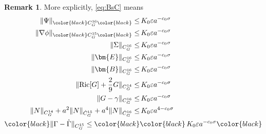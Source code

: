 \documentclass[11pt,leqno,textwidth=10cm]{amsart}
\numberwithin{equation}{section}
\theoremstyle{definition}
\newtheorem{remark}[definition]{Remark}
\theoremstyle{plain}
\newcommand{\1}{\mathbbm{1}}
\newcommand{\Ric}{\text{\normalfont{Ric}}}
\renewcommand{\epsilon}{\varepsilon}
\newcommand{\Gamhat}{\hat{\Gamma}}
\newcommand{\RE}{\bm{E}}
\newcommand{\RB}{\bm{B}}
\newcommand{\change}[1]{\color{black}#1\color{black}}
\begin{document}
\begin{remark}
More explicitly, \eqref{eq:BsC} means
\begin{subequations}
\begin{align}
\|\Psi\|_{\change{C^{16}_G}}\leq&\,K_0\epsilon a^{-c_0\sigma} \label{eq:BsPsi}\\
\|\nabla\phi\|_{\change{C^{15}_G}}\leq&\,K_0\epsilon a^{-c_0\sigma} \label{eq:Bsnablaphi}\\
\|\Sigma\|_{C^{16}_G}\leq&\,K_0\epsilon a^{-c_0\sigma} \label{eq:BsSigma}\\
\|\RE\|_{C^{16}_G}\leq&\,K_0\epsilon a^{-c_0\sigma} \label{eq:BsE}\\
\|\RB\|_{C^{16}_G}\leq&\,K_0\epsilon a^{-c_0\sigma} \label{eq:BsB}\\
\|\Ric[G]+\frac29G\|_{C^{14}_G}\leq&\,K_0\epsilon a^{-c_0\sigma} \label{eq:BsRic}\\
\|G-\gamma\|_{C^{16}_G}\leq&\,K_0\epsilon a^{-c_0\sigma} \label{eq:BsG}\\
\|N\|_{C^{14}_G}+a^2\|N\|_{\dot{C}^{15}_G}+a^4\|N\|_{\dot{C}^{16}_G}\leq&\,K_0\epsilon a^{4-c_0\sigma} \label{eq:BsN}\\
\change{\|\Gamma-\Gamhat\|_{C^{15}_G}\leq}&\change{\,K_0\epsilon a^{-c_0\sigma}} \label{eq:BsChr}
\end{align}
\end{subequations}
\end{remark}
\end{document}
